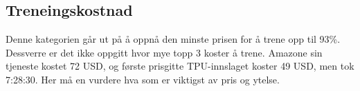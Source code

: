 \subsection{Treneingskostnad}
Denne kategorien går ut på å oppnå den minste prisen for å trene opp til 93\%. Dessverre er det ikke oppgitt hvor mye topp 3 koster å trene. Amazone sin tjeneste kostet 72 USD, og første prisgitte TPU-innslaget koster 49 USD, men tok 7:28:30. Her må en vurdere hva som er viktigst av pris og ytelse.

\printbibliography
